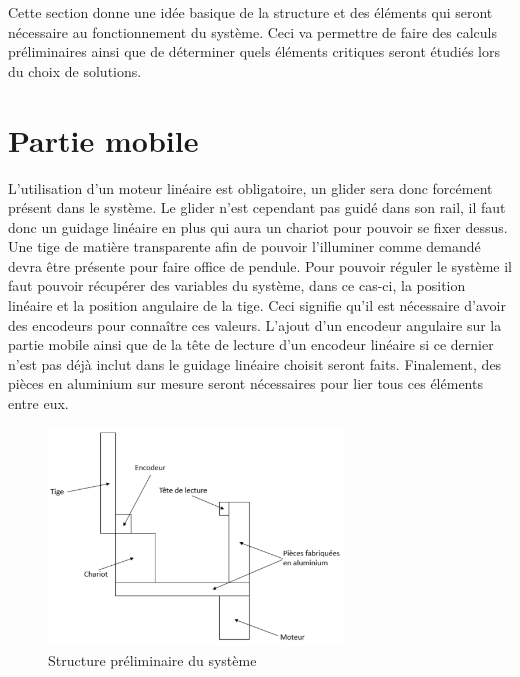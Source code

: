 Cette section donne une idée basique de la structure et des éléments qui seront nécessaire au fonctionnement du système.
Ceci va permettre de faire des calculs préliminaires ainsi que de déterminer quels éléments critiques seront étudiés lors du choix
de solutions.

\section{Partie mobile}\label{sec:PartMob}
L'utilisation d'un moteur linéaire est obligatoire, un \gls{glider} sera donc forcément présent dans le système. Le \gls{glider} n'est cependant
pas guidé dans son rail, il faut donc un guidage linéaire en plus qui aura un chariot pour pouvoir se fixer dessus. Une tige de matière
transparente afin de pouvoir l'illuminer comme demandé devra être présente pour faire office de pendule. Pour pouvoir réguler le système il faut pouvoir récupérer des variables
du système, dans ce cas-ci, la position linéaire et la position angulaire de la tige. Ceci signifie qu'il est nécessaire d'avoir des encodeurs
pour connaître ces valeurs. L'ajout d'un encodeur angulaire sur la partie mobile ainsi que de la tête de lecture d'un encodeur
linéaire si ce dernier n'est pas déjà inclut dans le guidage linéaire choisit seront faits. Finalement, des pièces en aluminium sur mesure seront nécessaires
pour lier tous ces éléments entre eux.

\begin{figure}[H]
  \centering
  \includegraphics[width = 0.7\textwidth]{assets/figures/StructPrelim.svg}
  \caption{Structure préliminaire du système}
  \label{fig:StructPrelim}
\end{figure}